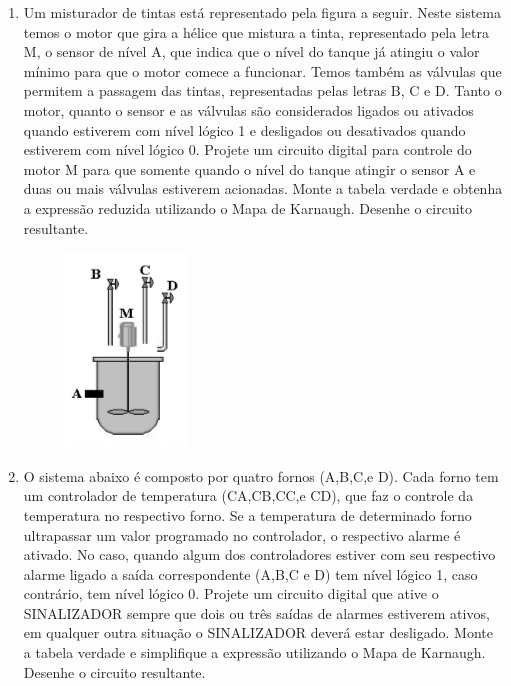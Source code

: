 \documentclass[12pt,onepage,a4paper]{memoir}
\begin{document}
\begin{enumerate}
    \item Um misturador de tintas está representado pela figura a seguir. Neste sistema temos o motor que gira a hélice que mistura a tinta, representado pela letra M, o sensor de nível A, que indica que o nível do tanque já atingiu o valor mínimo para que o motor comece a funcionar. Temos também as válvulas que permitem a passagem das tintas, representadas pelas letras B, C e D. Tanto o motor, quanto o sensor e as válvulas são considerados ligados ou ativados quando estiverem com nível lógico 1 e desligados ou desativados quando estiverem com nível lógico 0. Projete um circuito digital para controle do motor M para que somente quando o nível do tanque atingir o sensor A e duas ou mais válvulas estiverem acionadas. Monte a tabela verdade e obtenha a expressão reduzida utilizando o Mapa de Karnaugh. Desenhe o circuito resultante.

    \begin{figure}[H]
        \centering
        \includegraphics[scale=0.6]{fig/misturador.png}
        \label{fig:misturador}
    \end{figure}

    \item O sistema abaixo é composto por quatro fornos (A,B,C,e D). Cada forno tem um controlador de temperatura (CA,CB,CC,e CD), que faz o controle da temperatura no respectivo forno. Se a temperatura de determinado forno ultrapassar um valor programado no controlador, o respectivo alarme é ativado. No caso, quando algum dos controladores estiver com seu respectivo alarme ligado a saída correspondente (A,B,C e D) tem nível lógico 1, caso contrário, tem nível lógico 0. Projete um circuito digital que ative o SINALIZADOR sempre que dois ou três saídas de alarmes estiverem ativos, em qualquer outra situação o SINALIZADOR deverá estar desligado. Monte a tabela verdade e simplifique a expressão utilizando o Mapa de Karnaugh. Desenhe o circuito resultante.


\end{enumerate}
\end{document}
